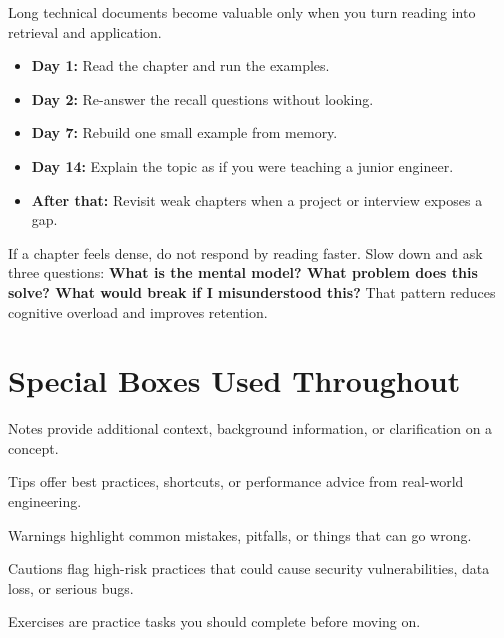 \documentclass[12pt, a4paper, oneside]{book}
\begin{document}
Long technical documents become valuable only when you turn reading into retrieval and application.

\begin{itemize}[leftmargin=2em]
    \item \textbf{Day 1:} Read the chapter and run the examples.
    \item \textbf{Day 2:} Re-answer the recall questions without looking.
    \item \textbf{Day 7:} Rebuild one small example from memory.
    \item \textbf{Day 14:} Explain the topic as if you were teaching a junior engineer.
    \item \textbf{After that:} Revisit weak chapters when a project or interview exposes a gap.
\end{itemize}

\begin{notebox}
If a chapter feels dense, do not respond by reading faster. Slow down and ask three questions: \textbf{What is the mental model? What problem does this solve? What would break if I misunderstood this?} That pattern reduces cognitive overload and improves retention.
\end{notebox}

\section*{Special Boxes Used Throughout}

\begin{notebox}
Notes provide additional context, background information, or clarification on a concept.
\end{notebox}

\begin{tipbox}
Tips offer best practices, shortcuts, or performance advice from real-world engineering.
\end{tipbox}

\begin{warningbox}
Warnings highlight common mistakes, pitfalls, or things that can go wrong.
\end{warningbox}

\begin{cautionbox}
Cautions flag high-risk practices that could cause security vulnerabilities, data loss, or serious bugs.
\end{cautionbox}

\begin{exercisebox}
Exercises are practice tasks you should complete before moving on.
\end{exercisebox}
\end{document}
